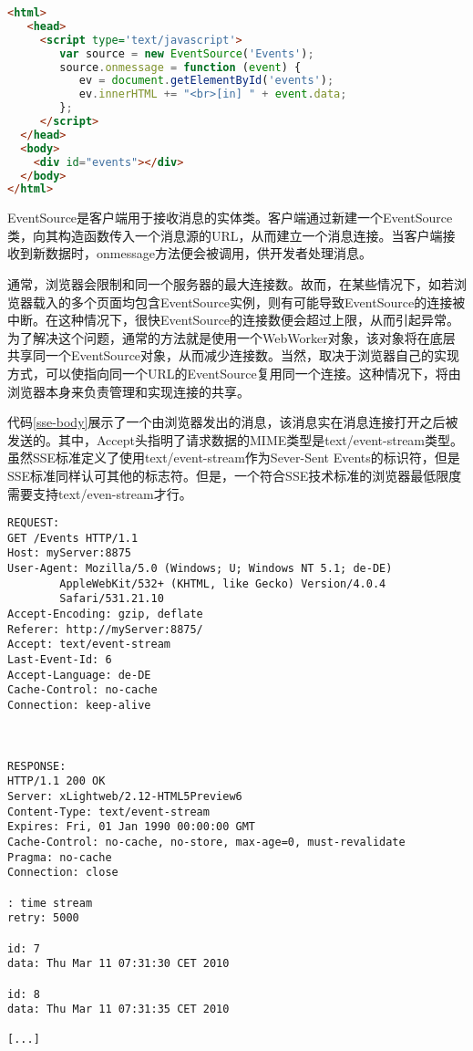 \begin{lstlisting}[caption={JavaScript使用EventSource的示例}, label=sse-js, language=html]
<html>
   <head>
     <script type='text/javascript'>
        var source = new EventSource('Events');
        source.onmessage = function (event) {
           ev = document.getElementById('events');
           ev.innerHTML += "<br>[in] " + event.data;
        };
     </script>
  </head>
  <body>
    <div id="events"></div>
  </body>
</html>
\end{lstlisting}

EventSource是客户端用于接收消息的实体类。客户端通过新建一个EventSource类，向其构造函数传入一个消息源的URL，从而建立一个消息连接。当客户端接收到新数据时，onmessage方法便会被调用，供开发者处理消息。

通常，浏览器会限制和同一个服务器的最大连接数。故而，在某些情况下，如若浏览器载入的多个页面均包含EventSource实例，则有可能导致EventSource的连接被中断。在这种情况下，很快EventSource的连接数便会超过上限，从而引起异常。为了解决这个问题，通常的方法就是使用一个WebWorker对象，该对象将在底层共享同一个EventSource对象，从而减少连接数。当然，取决于浏览器自己的实现方式，可以使指向同一个URL的EventSource复用同一个连接。这种情况下，将由浏览器本身来负责管理和实现连接的共享。

代码\ref{sse-body}展示了一个由浏览器发出的消息，该消息实在消息连接打开之后被发送的。其中，Accept头指明了请求数据的MIME类型是text/event-stream类型。虽然SSE标准定义了使用text/event-stream作为Sever-Sent Events的标识符，但是SSE标准同样认可其他的标志符。但是，一个符合SSE技术标准的浏览器最低限度需要支持text/even-stream才行。

\begin{lstlisting}[caption={SSE消息体示例}, label=sse-body]
REQUEST:
GET /Events HTTP/1.1
Host: myServer:8875
User-Agent: Mozilla/5.0 (Windows; U; Windows NT 5.1; de-DE) 
        AppleWebKit/532+ (KHTML, like Gecko) Version/4.0.4 
        Safari/531.21.10
Accept-Encoding: gzip, deflate
Referer: http://myServer:8875/
Accept: text/event-stream
Last-Event-Id: 6
Accept-Language: de-DE
Cache-Control: no-cache
Connection: keep-alive   



RESPONSE:
HTTP/1.1 200 OK
Server: xLightweb/2.12-HTML5Preview6
Content-Type: text/event-stream
Expires: Fri, 01 Jan 1990 00:00:00 GMT
Cache-Control: no-cache, no-store, max-age=0, must-revalidate
Pragma: no-cache
Connection: close

: time stream
retry: 5000

id: 7
data: Thu Mar 11 07:31:30 CET 2010

id: 8
data: Thu Mar 11 07:31:35 CET 2010

[...]
\end{lstlisting}

